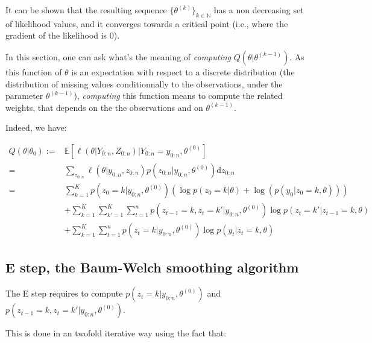 \documentclass[]{book}
\begin{document}
It can be shown that the resulting sequence
\(\lbrace\theta^{(k)} \rbrace_{k \in \mathbb{N}}\) has a non decreasing
set of likelihood values, and it converges towards a critical point
(i.e., where the gradient of the likelihood is 0).

In this section, one can ask what's the meaning of \emph{computing}
\(Q(\theta \vert \theta^{(k-1)})\). As this function of \(\theta\) is an
expectation with respect to a discrete distribution (the distribution of
missing values conditionnally to the observations, under the parameter
\(\theta^{(k-1)}\)), \emph{computing} this function means to compute the
related weights, that depends on the the observations and on
\(\theta^{(k-1)}\).

Indeed, we have:

\begin{align}
Q(\theta \vert \theta_0) :=& \mathbb{E}[\ell(\theta \vert Y_{0:n}, Z_{0:n}) \vert Y_{0:n} = y_{0:n}, \theta^{(0)}]\nonumber \\
=& \sum_{z_{0:n}} \ell(\theta \vert y_{0:n}, z_{0:n}) p(z_{0:n} \vert y_{0:n}, \theta^{(0)}) \text{d} z_{0:n} \nonumber \\
=& \sum_{k = 1}^K p(z_0 = k \vert y_{0:n}, \theta^{(0)})\left(\log p(z_0 = k \vert \theta) + \log(p(y_0 \vert z_0 = k, \theta))\right)  \nonumber \\
& + \sum_{k = 1}^K\sum_{k' = 1}^K \sum_{t = 1}^n p(z_{t-1} = k, z_{t} = k'\vert y_{0:n}, \theta^{(0)}) \log p(z_{t} = k' \vert z_{t - 1} = k,\theta) \nonumber \\
& + \sum_{k = 1}^K \sum_{t = 1}^n p(z_t = k\vert y_{0:n}, \theta^{(0)}) \log p(y_{t} \vert z_{t} = k, \theta) \nonumber
\end{align}

\subsection{E step, the Baum-Welch smoothing
algorithm}\label{e-step-the-baum-welch-smoothing-algorithm}

The E step requires to compute
\(p(z_t = k \vert y_{0:n}, \theta^{(0)})\) and
\(p(z_{t - 1} = k, z_{t} = k' \vert y_{0:n}, \theta^{(0)})\).

This is done in an twofold iterative way using the fact that:
\end{document}
